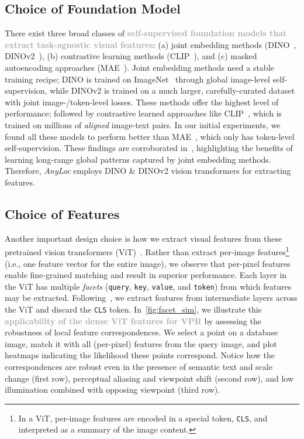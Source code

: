 \documentclass[letterpaper, 10 pt, conference]{ieeeconf}  \fi
\newcommand{\highlight}[1]{\textcolor{darkgray}{\textbf{#1}}}
\newcommand{\coolname}{\textit{AnyLoc}}
\newcommand{\dino}{\mbox{DINO}}
\newcommand{\dinovtwo}{\mbox{DINOv2}}
\begin{document}
\subsection{Choice of Foundation Model}
\label{sec:fmodels}

There exist three broad classes of \highlight{self-supervised foundation models that extract task-agnostic visual features}: (a) joint embedding methods (DINO~\cite{caron2021emerging}, DINOv2~\cite{oquab2023dinov2}), (b) contrastive learning methods (CLIP~\cite{radford2021learning}), and (c) masked autoencoding approaches (MAE~\cite{he2022masked}).
Joint embedding methods need a stable training recipe; \dino{} is trained on ImageNet~\cite{deng2009imagenet} through global image-level self-supervision, while \dinovtwo{} is trained on a much larger, carefully-curated dataset with joint image-/token-level losses.
These methods offer the highest level of performance; followed by contrastive learned approaches like CLIP~\cite{radford2021learning}, which is trained on millions of \textit{aligned} image-text pairs.
In our initial experiments, we found all these models to perform better than MAE~\cite{he2022masked}, which only has token-level self-supervision. These findings are corroborated in~\cite{park2023self,shekhar2023objectives,oquab2023dinov2}, highlighting the benefits of learning long-range global patterns captured by joint embedding methods.
Therefore, \coolname{} employs \dino{} \& \dinovtwo{} vision transformers for extracting features.

\subsection{Choice of Features}
\label{sec:features}

Another important design choice is how we extract visual features from these pretrained vision transformers (ViT)~\cite{dosovitskiy2020vit}.
Rather than extract per-image features\footnote{In a ViT, per-image features are encoded in a special token, \texttt{CLS}, and interpreted as a summary of the image content.}
(i.e., one feature vector for the entire image), we observe that per-pixel features enable fine-grained matching and result in superior performance.
Each layer in the ViT has multiple \emph{facets} (\texttt{query}, \texttt{key}, \texttt{value}, and \texttt{token}) from which features may be extracted.
Following~\cite{amir2021deep}, we extract features from intermediate layers across the ViT and discard the \texttt{CLS} token.
In~\cref{fig:facet_sim}, we illustrate this \highlight{applicability of the dense ViT features for VPR} by assessing the robustness of local feature correspondences.
We select a point on a database image, match it with all (per-pixel) features from the query image, and plot heatmaps indicating the likelihood these points correspond.
Notice how the correspondences are robust even in the presence of semantic text and scale change (first row), perceptual aliasing and viewpoint shift (second row), and low illumination combined with opposing viewpoint (third row).
\end{document}
